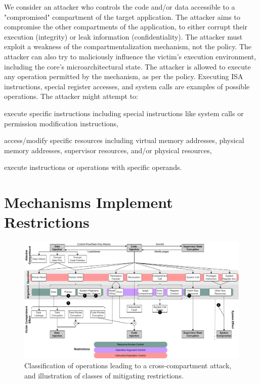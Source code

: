We consider an attacker who controls the code and/or data accessible to a
"compromised" compartment of the target application.
The attacker aims to compromise the other compartments of the application,
to either corrupt their execution (integrity) or leak 
information (confidentiality).
The attacker must exploit a weakness of the compartmentalization mechanism,
not the policy.
The attacker can also try to maliciously influence the victim's execution
environment, including the core's microarchitectural state.
The attacker is allowed to execute any operation permitted by the mechanism,
as per the policy.
Executing ISA instructions, special register accesses, and system calls are 
examples of possible operations.
The attacker might attempt to:
\begin{inparaenum}
  \item execute specific instructions including special instructions like
        system calls or permission modification instructions,
  \item access/modify specific resources including virtual memory addresses, 
        physical memory addresses, supervisor resources, and/or physical resources,
  \item execute instructions or operations with specific operands.
\end{inparaenum}

\section{Mechanisms Implement Restrictions}
\label{sec:compsok:properties}
\begin{figure}
  \includegraphics[width=\linewidth]{media/compsok/attacks.pdf}
  \caption[Classification of operations leading to a cross-compartment attack.]
          {Classification of operations leading to a cross-compartment attack, and
          illustration of classes of mitigating restrictions.}
  \label{fig:compsok:attacks}
\end{figure}

